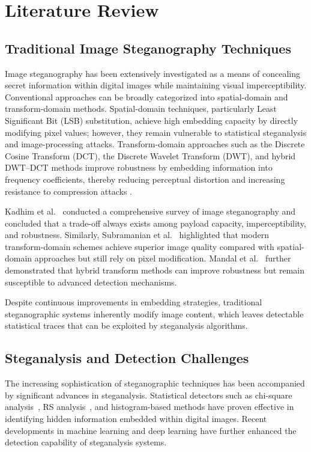 \documentclass[11pt]{article}
\theoremstyle{definition}
\begin{document}

\section{Literature Review}\label{sec:related}

\subsection{Traditional Image Steganography Techniques}
Image steganography has been extensively investigated as a means of concealing
secret information within digital images while maintaining visual imperceptibility.
Conventional approaches can be broadly categorized into spatial-domain and
transform-domain methods. Spatial-domain techniques, particularly Least Significant
Bit (LSB) substitution, achieve high embedding capacity by directly modifying pixel
values; however, they remain vulnerable to statistical steganalysis and
image-processing attacks. Transform-domain approaches such as the Discrete Cosine
Transform (DCT), the Discrete Wavelet Transform (DWT), and hybrid DWT--DCT methods
improve robustness by embedding information into frequency coefficients, thereby
reducing perceptual distortion and increasing resistance to compression attacks
\cite{subramanian,kombrink,qin,liSPHCG}.

Kadhim et al.\ \cite{kadhim} conducted a comprehensive survey of image steganography and
concluded that a trade-off always exists among payload capacity, imperceptibility,
and robustness. Similarly, Subramanian et al.\ \cite{subramanian} highlighted that modern
transform-domain schemes achieve superior image quality compared with
spatial-domain approaches but still rely on pixel modification. Mandal et al.\ \cite{mandal}
further demonstrated that hybrid transform methods can improve robustness but remain
susceptible to advanced detection mechanisms.

Despite continuous improvements in embedding strategies, traditional steganographic
systems inherently modify image content, which leaves detectable statistical traces
that can be exploited by steganalysis algorithms.

\subsection{Steganalysis and Detection Challenges}
The increasing sophistication of steganographic techniques has been accompanied by
significant advances in steganalysis. Statistical detectors such as chi-square
analysis~\cite{westfeld1999}, RS analysis~\cite{fridrich2001}, and histogram-based methods have proven effective in
identifying hidden information embedded within digital images. Recent developments
in machine learning and deep learning have further enhanced the detection capability
of steganalysis systems.
\end{document}
